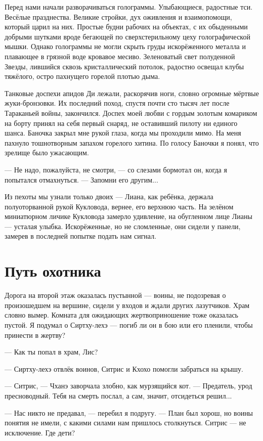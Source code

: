 Перед нами начали разворачиваться голограммы.
Улыбающиеся, радостные тси.
Весёлые празднества.
Великие стройки, дух оживления и взаимопомощи, который царил на них.
Простые будни рабочих на объектах, с их обыденными добрыми шутками вроде бегающей по сверхстерильному цеху голографической мышки.
Однако голограммы не могли скрыть груды искорёженного металла и плавающее в грязной воде кровавое месиво.
Зеленоватый свет полуденной Звезды, лившийся сквозь кристаллический потолок, радостно освещал клубы тяжёлого, остро пахнущего горелой плотью дыма.

Танковые доспехи апидов Ди лежали, раскорячив ноги, словно огромные мёртвые жуки-бронзовки.
Их последний поход, спустя почти сто тысяч лет после Тараканьей войны, закончился.
Доспех моей любви с гордым золотым комариком на борту принял на себя первый снаряд, не оставивший пилоту ни единого шанса.
Баночка закрыл мне рукой глаза, когда мы проходили мимо.
На меня пахнуло тошнотворным запахом горелого хитина.
По голосу Баночки я понял, что зрелище было ужасающим.

--- Не надо, пожалуйста, не смотри, --- со слезами бормотал он, когда я попытался отмахнуться.
--- Запомни его другим...

Из пехоты мы узнали только двоих --- Лиана, как ребёнка, держала полуоторванной рукой Кукловода, вернее, его верхнюю часть.
На зелёном миниатюрном личике Кукловода замерло удивление, на обугленном лице Лианы --- усталая улыбка.
Искорёженные, но не сломленные, они сидели у панели, замерев в последней попытке подать нам сигнал.

\section{Путь охотника}

Дорога на второй этаж оказалась пустынной --- воины, не подозревая о произошедшем на вершине, сидели у входов и ждали других лазутчиков.
Храм словно вымер.
Комната для ожидающих жертвоприношение тоже оказалась пустой.
Я подумал о Сиртху-лехэ --- погиб ли он в бою или его пленили, чтобы принести в жертву?

--- Как ты попал в храм, Лис?

--- Сиртху-лехэ отвлёк воинов, Ситрис и Кхохо помогли забраться на крышу.

--- Ситрис, --- Чханэ заворчала злобно, как мурзящийся кот.
--- Предатель, урод пресноводный.
Тебя на смерть послал, а сам, значит, отсидеться решил...

--- Нас никто не предавал, --- перебил я подругу.
--- План был хорош, но воины понятия не имели, с какими силами нам пришлось столкнуться.
Ситрис --- не исключение.
Где дети?

